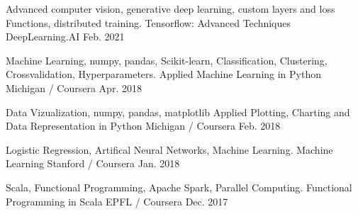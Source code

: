 

\begin{cventries}


    {}

    \course
    {Advanced computer vision, generative deep learning, custom layers and loss Functions, distributed training.} %
    {Tensorflow: Advanced Techniques} %
    {DeepLearning.AI} %
    {Feb. 2021} %
    {}

    \course
    {Machine Learning, numpy, pandas, Scikit-learn, Classification, Clustering, Crossvalidation, Hyperparameters.} %
    {Applied Machine Learning in Python} %
    {Michigan / Coursera} %
    {Apr. 2018} %
    {}

   \course
   {Data Vizualization, numpy, pandas, matplotlib} %
   {Applied Plotting, Charting and Data Representation in Python} %
   {Michigan / Coursera} %
   {Feb. 2018} %
   {}

    \course
    {Logistic Regression, Artifical Neural Networks, Machine Learning.} %
    {Machine Learning} %
    {Stanford / Coursera} %
    {Jan. 2018} %
    {}

    \course
    {Scala, Functional Programming, Apache Spark, Parallel Computing.} %
    {Functional Programming in Scala} %
    {EPFL / Coursera} %
    {Dec. 2017} %
    {}

\end{cventries}